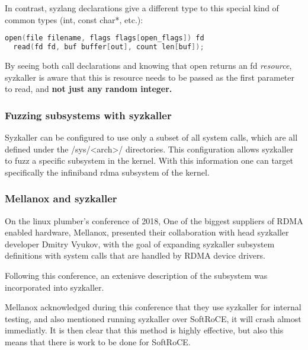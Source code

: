 In contrast, syzlang declarations give a different type to this special kind of common types (int, const char*, etc.):

\begin{lstlisting}[caption={syzlang definitions for open and read}, label={lst:syzlangdefs}, language=c]
  open(file filename, flags flags[open_flags]) fd
  read(fd fd, buf buffer[out], count len[buf]);
\end{lstlisting}

By seeing both call declarations and knowing that open returns an fd \emph{resource}, syzkaller is aware
that this is resource needs to be passed as the first parameter to read, and \textbf{not just any random integer.}

\subsubsection{Fuzzing subsystems with syzkaller}

Syzkaller can be configured to use only a subset of all system calls, which are all defined under
the /sys/<arch>/ directories. This configuration allows syzkaller to fuzz
a specific subsystem in the kernel. With this information one can target specifically
the infiniband rdma subsystem of the kernel.


\subsubsection{Mellanox and syzkaller}

On the linux plumber's conference of 2018, One of the biggest suppliers of RDMA enabled hardware, Mellanox,
presented their collaboration with head syzkaller
developer Dmitry Vyukov, with the goal of expanding syzkaller subsystem definitions with system calls
that are handled by RDMA device drivers\cite{osherovichImprovingTestingRDMA2018}.

Following this conference, an extenisve description of the subsystem was incorporated into syzkaller.

Mellanox acknowledged during this conference that they use syzkaller for internal testing,
and also mentioned running syzkaller over SoftRoCE, it will crash almost immediatly. It is then clear
that this method is highly effective, but also this means that there is work to be done
for SoftRoCE.



